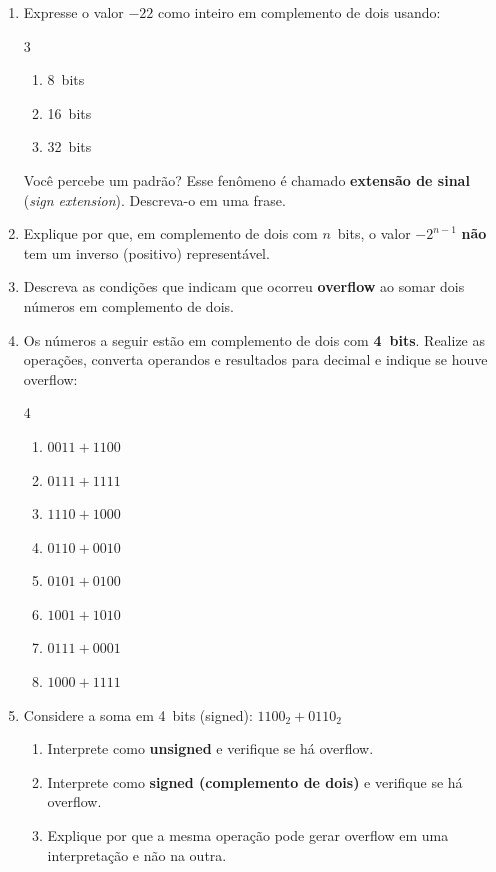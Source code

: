\documentclass[11pt, a4paper]{article}
\begin{document}
\begin{enumerate}
\item Expresse o valor $-22$ como inteiro em complemento de dois usando:
\begin{multicols}{3}
\begin{enumerate}
  \item 8~bits
  \item 16~bits
  \item 32~bits
\end{enumerate}
\end{multicols}
\vspace{-2pt}
Voc\^{e} percebe um padr\~{a}o? Esse fen\^{o}meno \'{e} chamado \textbf{extens\~{a}o de sinal} (\emph{sign extension}). Descreva-o em uma frase.

\item Explique por que, em complemento de dois com $n$~bits, o valor $-2^{n-1}$ \textbf{n\~{a}o} tem um inverso (positivo) represent\'{a}vel.
\item Descreva as condi\c{c}\~{o}es que indicam que ocorreu \textbf{overflow} ao somar dois n\'{u}meros em complemento de dois.

\item Os n\'{u}meros a seguir est\~{a}o em complemento de dois com \textbf{4~bits}. Realize as opera\c{c}\~{o}es, converta operandos e resultados para decimal e indique se houve overflow:
\begin{multicols}{4}
\begin{enumerate}
  \item $0011 + 1100$
  \item $0111 + 1111$
  \item $1110 + 1000$
  \item $0110 + 0010$
  \item $0101 + 0100$
  \item $1001 + 1010$
  \item $0111 + 0001$
  \item $1000 + 1111$
\end{enumerate}
\end{multicols}

\item Considere a soma em 4~bits (signed): $1100_2 + 0110_2$
\begin{enumerate}
  \item Interprete como \textbf{unsigned} e verifique se h\'{a} overflow.
  \item Interprete como \textbf{signed (complemento de dois)} e verifique se h\'{a} overflow.
  \item Explique por que a mesma opera\c{c}\~{a}o pode gerar overflow em uma interpreta\c{c}\~{a}o e n\~{a}o na outra.
\end{enumerate}


\end{enumerate}
\end{document}
